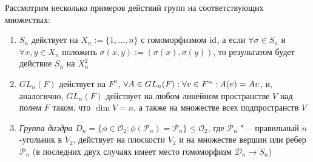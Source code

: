 \begin{example}
	Рассмотрим несколько примеров действий групп на соответствующих множествах:
	\begin{enumerate}
		\item $S_n$ действует на $X_n := \{1, \dotsc, n\}$ с гомоморфизмом $\operatorname{id}$, а если $\forall \sigma \in S_n$ и $\forall x, y \in X_n$ положить $\sigma(x, y) := (\sigma(x), \sigma(y))$, то результатом будет действие $S_n$ на $X_n^2$
		\item $GL_n(F)$ действует на $F^n$, $\forall A \in GL_n(F): \forall v \in F^n: A(v) \hm= Av$, и, аналогично, $GL_n(F)$ действует на любом линейном пространстве $V$ над полем $F$ таком, что $\dim{V} = n$, а также на множестве всех подпространств $V$
		\item \textit{Группа диэдра} $D_n = \{\phi \in \mathcal{O}_2: \phi(\mathcal{P}_n) = \mathcal{P}_n\} \le \mathcal{O}_2$, где $\mathcal{P}_n$ "--- правильный $n$-угольник в $V_2$, действует на плоскости $V_2$ и на множестве вершин или ребер $\mathcal{P}_n$ (в последних двух случаях имеет место гомоморфизм $\mathcal{D}_n \to S_n$)
	\end{enumerate}
\end{example}